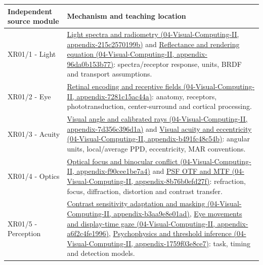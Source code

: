 {\def\LTcaptype{none} %
\begin{longtable}[]{@{}
  >{\raggedright\arraybackslash}p{}
  >{\raggedright\arraybackslash}p{}@{}}
\toprule\noalign{}
\begin{minipage}[b]{\linewidth}\raggedright
Independent source module
\end{minipage} & \begin{minipage}[b]{\linewidth}\raggedright
Mechanism and teaching location
\end{minipage} \\
\midrule\noalign{}
\endhead
\bottomrule\noalign{}
\endlastfoot
XR01/1 - Light & \href{../04-Visual-Computing-II/main.pdf\#nameddest=appendix-215c2570199b}{Light spectra and radiometry (04-Visual-Computing-II, appendix-215c2570199b)} and \href{../04-Visual-Computing-II/main.pdf\#nameddest=appendix-96da0b153b77}{Reflectance and rendering equation (04-Visual-Computing-II, appendix-96da0b153b77)}: spectra/receptor response, units, BRDF and transport assumptions. \\
XR01/2 - Eye & \href{../04-Visual-Computing-II/main.pdf\#nameddest=appendix-7281c15ac44a}{Retinal encoding and receptive fields (04-Visual-Computing-II, appendix-7281c15ac44a)}: anatomy, receptors, phototransduction, center-surround and cortical processing. \\
XR01/3 - Acuity & \href{../04-Visual-Computing-II/main.pdf\#nameddest=appendix-7d356c396d1a}{Visual angle and calibrated rays (04-Visual-Computing-II, appendix-7d356c396d1a)} and \href{../04-Visual-Computing-II/main.pdf\#nameddest=appendix-b491fc48c54b}{Visual acuity and eccentricity (04-Visual-Computing-II, appendix-b491fc48c54b)}: angular units, local/average PPD, eccentricity, MAR conventions. \\
XR01/4 - Optics & \href{../04-Visual-Computing-II/main.pdf\#nameddest=appendix-f90cee1be7a4}{Optical focus and binocular conflict (04-Visual-Computing-II, appendix-f90cee1be7a4)} and \href{../04-Visual-Computing-II/main.pdf\#nameddest=appendix-8b76b0efd27f}{PSF OTF and MTF (04-Visual-Computing-II, appendix-8b76b0efd27f)}: refraction, focus, diffraction, distortion and contrast transfer. \\
XR01/5 - Perception & \href{../04-Visual-Computing-II/main.pdf\#nameddest=appendix-b3aa9e8e01ad}{Contrast sensitivity adaptation and masking (04-Visual-Computing-II, appendix-b3aa9e8e01ad)}, \href{../04-Visual-Computing-II/main.pdf\#nameddest=appendix-a6f2c4fe1996}{Eye movements and display-time gaze (04-Visual-Computing-II, appendix-a6f2c4fe1996)}, \href{../04-Visual-Computing-II/main.pdf\#nameddest=appendix-1759f03e8ce7}{Psychophysics and threshold inference (04-Visual-Computing-II, appendix-1759f03e8ce7)}: task, timing and detection models. \\

\end{longtable}}
